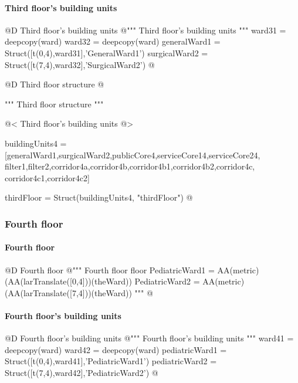 \documentclass[11pt,oneside]{article}    %
\begin{document}
\paragraph{Third floor's building units}
@D Third floor's building units 
@{""" Third floor's building units """
ward31 = deepcopy(ward)
ward32 = deepcopy(ward)
generalWard1 = Struct([t(0,4),ward31],'GeneralWard1')
surgicalWard2 = Struct([t(7,4),ward32],'SurgicalWard2')
@}

@D Third floor structure
@{""" Third floor structure """

@< Third floor's building units @>

buildingUnits4 = [generalWard1,surgicalWard2,publicCore4,serviceCore14,serviceCore24,
                filter1,filter2,corridor4a,corridor4b,corridor4b1,corridor4b2,corridor4c,
                corridor4c1,corridor4c2]

thirdFloor = Struct(buildingUnits4, "thirdFloor")
@}


\subsubsection{Fourth floor}
\paragraph{Fourth floor}
@D Fourth floor
@{""" Fourth floor floor 
PediatricWard1 = AA(metric)(AA(larTranslate([0,4]))(theWard))
PediatricWard2 = AA(metric)(AA(larTranslate([7,4]))(theWard)) """
@}

\paragraph{Fourth floor's building units}
@D Fourth floor's building units 
@{""" Fourth floor's building units """
ward41 = deepcopy(ward)
ward42 = deepcopy(ward)
pediatricWard1 = Struct([t(0,4),ward41],'PediatricWard1')
pediatricWard2 = Struct([t(7,4),ward42],'PediatricWard2')
@}
\end{document}
